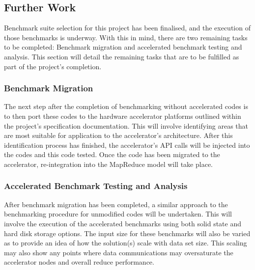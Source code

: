 \documentclass[12pt,a4paper]{article}
\begin{document}
        \subsection{Further Work}
        \label{sub:further_work}

            Benchmark suite selection for this project has been finalised, and the execution of those benchmarks is underway. With this in mind, there are two remaining tasks to be completed: Benchmark migration and accelerated benchmark testing and analysis. This section will detail the remaining tasks that are to be fulfilled as part of the project's completion.

                \subsubsection{Benchmark Migration}
                \label{sub:benchmark_migration}

                    The next step after the completion of benchmarking without accelerated codes is to then port these codes to the hardware accelerator platforms outlined within the project's specification documentation. This will involve identifying areas that are most suitable for application to the accelerator's architecture. After this identification process has finished, the accelerator's API calls will be injected into the codes and this code tested. Once the code has been migrated to the accelerator, re-integration into the MapReduce model will take place.

                \subsubsection{Accelerated Benchmark Testing and Analysis}
                \label{sub:accelerated_benchmark_testing_and_analysis}

                    After benchmark migration has been completed, a similar approach to the benchmarking procedure for unmodified codes will be undertaken. This will involve the execution of the accelerated benchmarks using both solid state and hard disk storage options. The input size for these benchmarks will also be varied as to provide an idea of how the solution(s) scale with data set size. This scaling may also show any points where data communications may oversaturate the accelerator nodes and overall reduce performance.
        
        
\end{document}
